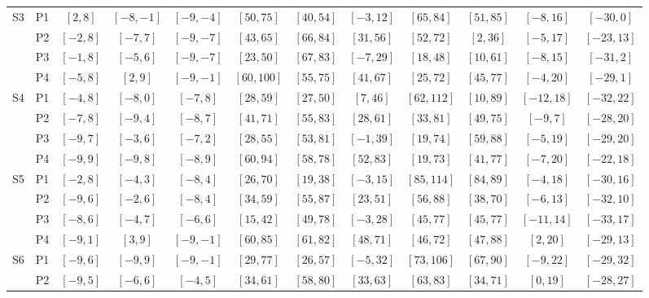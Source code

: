 \begin{table}[!ht]
{\begin{tabular}{|c|c||c|c|c|c|c|c|c|c|c|c|}
    \hline
    \hline
    \multirow{4}{*}{S3} & P1 & $[2, 8]$ & $[-8, -1]$ & $[-9, -4]$ & $[50, 75]$ & $[40, 54]$ & $[-3, 12]$ & $[65, 84]$ & $[51, 85]$ & $[-8, 16]$ & $[-30, 0]$ \\
     & P2 & $[-2, 8]$ & $[-7, 7]$ & $[-9, -7]$ & $[43, 65]$ & $[66, 84]$ & $[31, 56]$ & $[52, 72]$ & $[2, 36]$ & $[-5, 17]$ & $[-23, 13]$ \\
     & P3 & $[-1, 8]$ & $[-5, 6]$ & $[-9, -7]$ & $[23, 50]$ & $[67, 83]$ & $[-7, 29]$ & $[18, 48]$ & $[10, 61]$ & $[-8, 15]$ & $[-31, 2]$ \\
     & P4 & $[-5, 8]$ & $[2, 9]$ & $[-9, -1]$ & $[60, 100]$ & $[55, 75]$ & $[41, 67]$ & $[25, 72]$ & $[45, 77]$ & $[-4, 20]$ & $[-29, 1]$ \\
    \hline
    \hline
    \multirow{4}{*}{S4} & P1 & $[-4, 8]$ & $[-8, 0]$ & $[-7, 8]$ & $[28, 59]$ & $[27, 50]$ & $[7, 46]$ & $[62, 112]$ & $[10, 89]$ & $[-12, 18]$ & $[-32, 22]$ \\
     & P2 & $[-7, 8]$ & $[-9, 4]$ & $[-8, 7]$ & $[41, 71]$ & $[55, 83]$ & $[28, 61]$ & $[33, 81]$ & $[49, 75]$ & $[-9, 7]$ & $[-28, 20]$ \\
     & P3 & $[-9, 7]$ & $[-3, 6]$ & $[-7, 2]$ & $[28, 55]$ & $[53, 81]$ & $[-1, 39]$ & $[19, 74]$ & $[59, 88]$ & $[-5, 19]$ & $[-29, 20]$ \\
     & P4 & $[-9, 9]$ & $[-9, 8]$ & $[-8, 9]$ & $[60, 94]$ & $[58, 78]$ & $[52, 83]$ & $[19, 73]$ & $[41, 77]$ & $[-7, 20]$ & $[-22, 18]$ \\
    \hline
    \hline
    \multirow{4}{*}{S5} & P1 & $[-2, 8]$ & $[-4, 3]$ & $[-8, 4]$ & $[26, 70]$ & $[19, 38]$ & $[-3, 15]$ & $[85, 114]$ & $[84, 89]$ & $[-4, 18]$ & $[-30, 16]$ \\
     & P2 & $[-9, 6]$ & $[-2, 6]$ & $[-8, 4]$ & $[34, 59]$ & $[55, 87]$ & $[23, 51]$ & $[56, 88]$ & $[38, 70]$ & $[-6, 13]$ & $[-32, 10]$ \\
     & P3 & $[-8, 6]$ & $[-4, 7]$ & $[-6, 6]$ & $[15, 42]$ & $[49, 78]$ & $[-3, 28]$ & $[45, 77]$ & $[45, 77]$ & $[-11, 14]$ & $[-33, 17]$ \\
     & P4 & $[-9, 1]$ & $[3, 9]$ & $[-9, -1]$ & $[60, 85]$ & $[61, 82]$ & $[48, 71]$ & $[46, 72]$ & $[47, 88]$ & $[2, 20]$ & $[-29, 13]$ \\
    \hline
    \hline
    \multirow{4}{*}{S6} & P1 & $[-9, 6]$ & $[-9, 9]$ & $[-9, -1]$ & $[29, 77]$ & $[26, 57]$ & $[-5, 32]$ & $[73, 106]$ & $[67, 90]$ & $[-9, 22]$ & $[-29, 32]$ \\
     & P2 & $[-9, 5]$ & $[-6, 6]$ & $[-4, 5]$ & $[34, 61]$ & $[58, 80]$ & $[33, 63]$ & $[63, 83]$ & $[34, 71]$ & $[0, 19]$ & $[-28, 27]$ \\

\end{tabular}}
\end{table}
